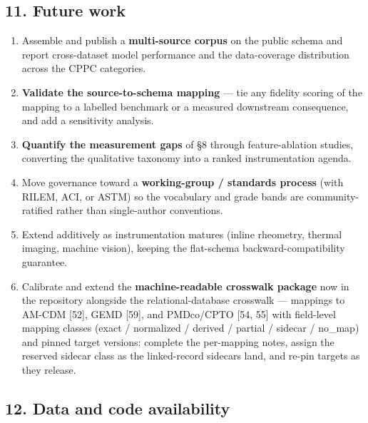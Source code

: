 \documentclass[
  11pt,
  letterpaper,
]{article}
\providecommand{\tightlist}{%
  \setlength{\itemsep}{0pt}\setlength{\parskip}{0pt}}
\begin{document}
\subsection{11. Future work}\label{future-work}

\begin{enumerate}
\def\labelenumi{\arabic{enumi}.}
\tightlist
\item
  Assemble and publish a \textbf{multi-source corpus} on the public
  schema and report cross-dataset model performance and the
  data-coverage distribution across the CPPC categories.
\item
  \textbf{Validate the source-to-schema mapping} --- tie any fidelity
  scoring of the mapping to a labelled benchmark or a measured
  downstream consequence, and add a sensitivity analysis.
\item
  \textbf{Quantify the measurement gaps} of §8 through feature-ablation
  studies, converting the qualitative taxonomy into a ranked
  instrumentation agenda.
\item
  Move governance toward a \textbf{working-group / standards process}
  (with RILEM, ACI, or ASTM) so the vocabulary and grade bands are
  community-ratified rather than single-author conventions.
\item
  Extend additively as instrumentation matures (inline rheometry,
  thermal imaging, machine vision), keeping the flat-schema
  backward-compatibility guarantee.
\item
  Calibrate and extend the \textbf{machine-readable crosswalk package}
  now in the repository alongside the relational-database crosswalk ---
  mappings to AM-CDM {[}52{]}, GEMD {[}59{]}, and PMDco/CPTO {[}54,
  55{]} with field-level mapping classes (exact / normalized / derived /
  partial / sidecar / no\_map) and pinned target versions: complete the
  per-mapping notes, assign the reserved sidecar class as the
  linked-record sidecars land, and re-pin targets as they release.
\end{enumerate}

\subsection{12. Data and code
availability}\label{data-and-code-availability}
\end{document}
